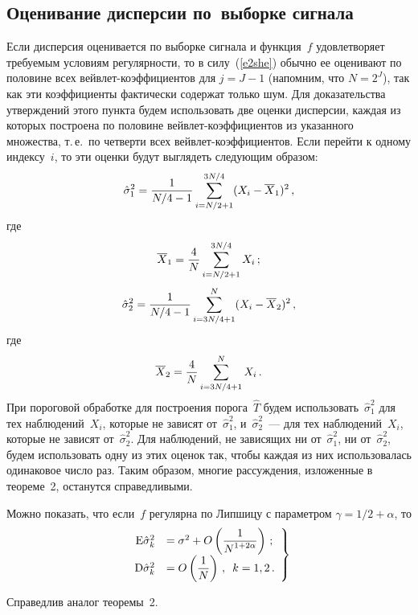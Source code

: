 \begin{multicols}{2}
\section{Оценивание дисперсии по~выборке сигнала}

Если дисперсия оценивается по выборке сигнала и функция~$f$ удовлетворяет требуемым условиям регулярности, то в 
силу~(\ref{e2she}) обычно ее оценивают по половине всех вейвлет-коэффициентов для $j=J-1$ 
(напомним, что $N=2^J$), так как эти коэффициенты фактически содержат только шум. 
Для доказательства утверждений этого пункта будем использовать две оценки дисперсии, 
каж\-дая из которых построена по половине вейвлет-коэффициентов из указанного множества, т.\,е.\
по четверти всех вейвлет-коэффициентов. Если перейти к одному индексу~$i$, то эти оценки будут 
выглядеть следующим образом:
\begin{equation}
\hat{\sigma}_1^2=\displaystyle\frac{\displaystyle 1\mathstrut}{\displaystyle N/4-1\mathstrut}\sum_{i=N/2+1}^{3N/4}(X_i-\overline{X}_1)^2\,,
\label{e23she}
\end{equation}
где
$$ \overline{X}_1=\displaystyle\frac{\displaystyle 4\mathstrut}{\displaystyle N\mathstrut}\sum_{i=N/2+1}^{3N/4}X_i\,;$$
\begin{equation}
\hat{\sigma}_2^2=\displaystyle\frac{\displaystyle 1\mathstrut}{\displaystyle N/4-1\mathstrut}\sum_{i=3N/4+1}^{N}(X_i-\overline{X}_2)^2\,,
\label{e24she}
\end{equation}
где
$$\overline{X}_2=\displaystyle\frac{\displaystyle 4\mathstrut}{\displaystyle N\mathstrut}\sum_{i=3N/4+1}^{N}X_i\,.
$$
При пороговой обработке для построения порога~$\hat{T}$ будем использовать~$\hat{\sigma}_1^2$ для тех наблюдений~$X_i$, 
которые не зависят от~$\hat{\sigma}_1^2$, и~$\hat{\sigma}_2^2$~--- для тех наблюдений~$X_i$, которые не зависят 
от~$\hat{\sigma}_2^2$. Для наблюдений, не зависящих ни от~$\hat{\sigma}_1^2$, ни от~$\hat{\sigma}_2^2$, 
будем использовать одну из этих оценок так, чтобы каждая из них использовалась одинаковое число раз. 
Таким образом, многие рассуждения, изложенные в теореме~2, останутся справедливыми.

Можно показать, что если~$f$ регулярна по Липшицу с параметром 
$\gamma=1/2+\alpha$, то
\begin{equation}
\left.
\begin{array}{rl}
\mbox{E}\hat{\sigma}_k^2&=\sigma^2+O\left(\displaystyle\frac{\displaystyle 1\mathstrut}{\displaystyle N^{1+2\alpha}\mathstrut}\right)\,;\\
\mbox{D}\hat{\sigma}_k^2&=O\left(\displaystyle\frac{\displaystyle 1\mathstrut}{\displaystyle N\mathstrut}\right)\,,\enskip k=1,2\,.
\end{array}
\right \}
\label{e25she}
\end{equation}

Справедлив аналог теоремы~2.

\medskip


\end{multicols}
